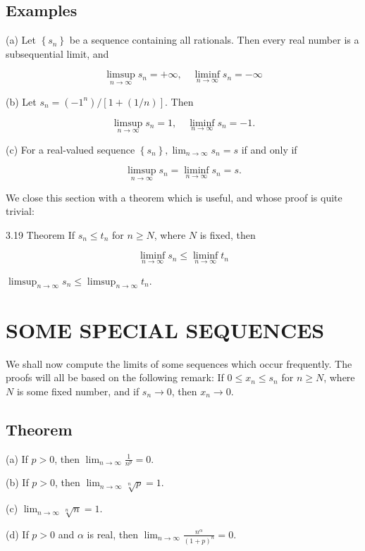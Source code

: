 \documentclass[10pt]{article}
\begin{document}
\subsection{Examples}
(a) Let $\left\{s_{n}\right\}$ be a sequence containing all rationals. Then every real number is a subsequential limit, and

$$
\limsup _{n \rightarrow \infty} s_{n}=+\infty, \quad \liminf _{n \rightarrow \infty} s_{n}=-\infty
$$

(b) Let $s_{n}=\left(-1^{n}\right) /[1+(1 / n)]$. Then

$$
\limsup _{n \rightarrow \infty} s_{n}=1, \quad \liminf _{n \rightarrow \infty} s_{n}=-1 .
$$

(c) For a real-valued sequence $\left\{s_{n}\right\}, \lim _{n \rightarrow \infty} s_{n}=s$ if and only if

$$
\limsup _{n \rightarrow \infty} s_{n}=\liminf _{n \rightarrow \infty} s_{n}=s .
$$

We close this section with a theorem which is useful, and whose proof is quite trivial:

3.19 Theorem If $s_{n} \leq t_{n}$ for $n \geq N$, where $N$ is fixed, then

$$
\liminf _{n \rightarrow \infty} s_{n} \leq \liminf _{n \rightarrow \infty} t_{n}
$$

$\limsup _{n \rightarrow \infty} s_{n} \leq \limsup _{n \rightarrow \infty} t_{n}$.

\section{SOME SPECIAL SEQUENCES}
We shall now compute the limits of some sequences which occur frequently. The proofs will all be based on the following remark: If $0 \leq x_{n} \leq s_{n}$ for $n \geq N$, where $N$ is some fixed number, and if $s_{n} \rightarrow 0$, then $x_{n} \rightarrow 0$.

\subsection{Theorem}
(a) If $p>0$, then $\lim _{n \rightarrow \infty} \frac{1}{n^{p}}=0$.

(b) If $p>0$, then $\lim _{n \rightarrow \infty} \sqrt[n]{p}=1$.

(c) $\lim _{n \rightarrow \infty} \sqrt[n]{n}=1$.

(d) If $p>0$ and $\alpha$ is real, then $\lim _{n \rightarrow \infty} \frac{n^{\alpha}}{(1+p)^{n}}=0$.
\end{document}
